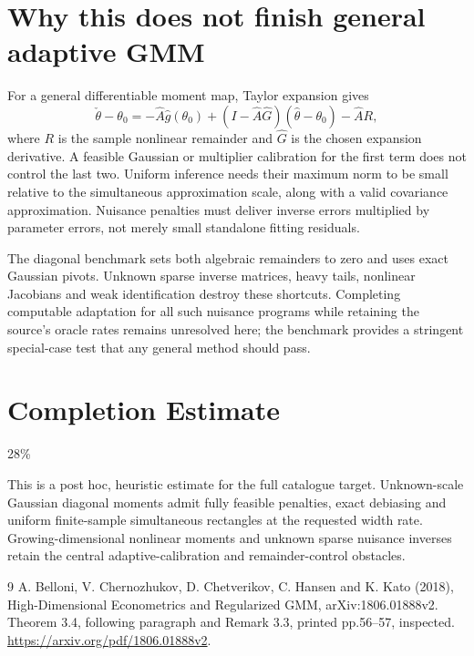 \documentclass[11pt]{article}
\begin{document}
\section*{Why this does not finish general adaptive GMM}
For a general differentiable moment map, Taylor expansion gives
\[
 \check\theta-\theta_0=-\widehat A\widehat g(\theta_0)
 +(I-\widehat A\widehat G)(\widehat\theta-\theta_0)
 -\widehat A R,
\]
where $R$ is the sample nonlinear remainder and $\widehat G$ is the chosen expansion derivative. A feasible Gaussian or multiplier calibration for the first term does not control the last two. Uniform inference needs their maximum norm to be small relative to the simultaneous approximation scale, along with a valid covariance approximation. Nuisance penalties must deliver inverse errors multiplied by parameter errors, not merely small standalone fitting residuals.

The diagonal benchmark sets both algebraic remainders to zero and uses exact Gaussian pivots. Unknown sparse inverse matrices, heavy tails, nonlinear Jacobians and weak identification destroy these shortcuts. Completing computable adaptation for all such nuisance programs while retaining the source's oracle rates remains unresolved here; the benchmark provides a stringent special-case test that any general method should pass.

\section{Completion Estimate}
28\%

This is a post hoc, heuristic estimate for the full catalogue target.
Unknown-scale Gaussian diagonal moments admit fully feasible penalties, exact debiasing and uniform finite-sample simultaneous rectangles at the requested width rate. Growing-dimensional nonlinear moments and unknown sparse nuisance inverses retain the central adaptive-calibration and remainder-control obstacles.

\begin{thebibliography}{9}
 A. Belloni, V. Chernozhukov, D. Chetverikov, C. Hansen and K. Kato (2018), High-Dimensional Econometrics and Regularized GMM, arXiv:1806.01888v2. Theorem 3.4, following paragraph and Remark 3.3, printed pp.56--57, inspected. \url{https://arxiv.org/pdf/1806.01888v2}.
\end{thebibliography}
\end{document}
